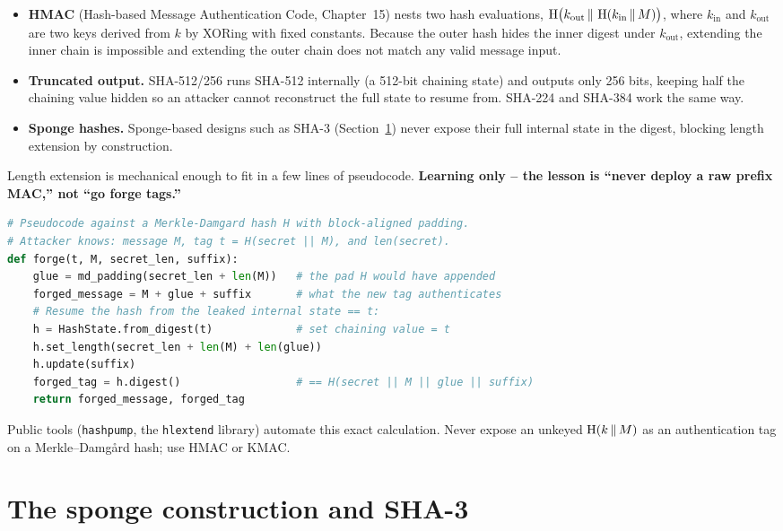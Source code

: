\begin{itemize}
  \item \textbf{HMAC} (Hash-based Message Authentication Code, Chapter~15) nests two hash evaluations, $\operatorname{H}\bigl(k_{\text{out}} \,\|\, \operatorname{H}(k_{\text{in}} \,\|\, M)\bigr)$, where $k_{\text{in}}$ and $k_{\text{out}}$ are two keys derived from $k$ by XORing with fixed constants. Because the outer hash hides the inner digest under $k_{\text{out}}$, extending the inner chain is impossible and extending the outer chain does not match any valid message input.
  \item \textbf{Truncated output.} SHA-512/256 runs SHA-512 internally (a 512-bit chaining state) and outputs only 256 bits, keeping half the chaining value hidden so an attacker cannot reconstruct the full state to resume from. SHA-224 and SHA-384 work the same way.
  \item \textbf{Sponge hashes.} Sponge-based designs such as SHA-3 (Section~\ref{ch14:sponge}) never expose their full internal state in the digest, blocking length extension by construction.
\end{itemize}

\begin{implementbox}
Length extension is mechanical enough to fit in a few lines of pseudocode. \textbf{Learning only -- the lesson is ``never deploy a raw prefix MAC,'' not ``go forge tags.''}
\begin{lstlisting}[language=Python]
# Pseudocode against a Merkle-Damgard hash H with block-aligned padding.
# Attacker knows: message M, tag t = H(secret || M), and len(secret).
def forge(t, M, secret_len, suffix):
    glue = md_padding(secret_len + len(M))   # the pad H would have appended
    forged_message = M + glue + suffix       # what the new tag authenticates
    # Resume the hash from the leaked internal state == t:
    h = HashState.from_digest(t)             # set chaining value = t
    h.set_length(secret_len + len(M) + len(glue))
    h.update(suffix)
    forged_tag = h.digest()                  # == H(secret || M || glue || suffix)
    return forged_message, forged_tag
\end{lstlisting}
Public tools (\texttt{hashpump}, the \texttt{hlextend} library) automate this exact calculation. Never expose an unkeyed $\operatorname{H}(k \,\|\, M)$ as an authentication tag on a Merkle--Damg\aa{}rd hash; use HMAC or KMAC.
\end{implementbox}

\section{The sponge construction and SHA-3}
\label{ch14:sponge}

